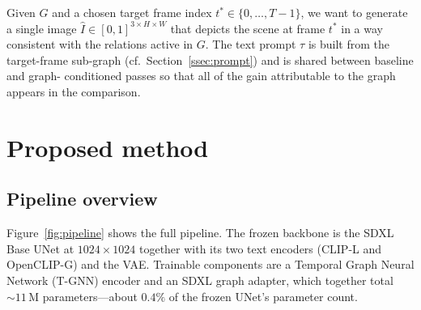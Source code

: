 \documentclass[11pt]{article}
\begin{document}
Given $G$ and a chosen target frame index $t^* \in
\{0,\ldots,T-1\}$, we want to generate a single image
$\hat{I}\in[0,1]^{3\times H\times W}$ that depicts the scene at frame
$t^*$ in a way consistent with the relations active in $G$. The text
prompt $\tau$ is built from the target-frame sub-graph (cf.\
Section~\ref{ssec:prompt}) and is shared between baseline and graph-
conditioned passes so that all of the gain attributable to the graph
appears in the comparison.

\section{Proposed method}
\label{sec:method}
\subsection{Pipeline overview}
Figure~\ref{fig:pipeline} shows the full pipeline. The frozen
backbone is the SDXL Base UNet at $1024\times 1024$ together with its
two text encoders (CLIP-L and OpenCLIP-G) and the VAE. Trainable
components are a Temporal Graph Neural Network (T-GNN) encoder and an
SDXL graph adapter, which together total $\sim 11\,\text{M}$
parameters---about $0.4\%$ of the frozen UNet's parameter count.
\end{document}
